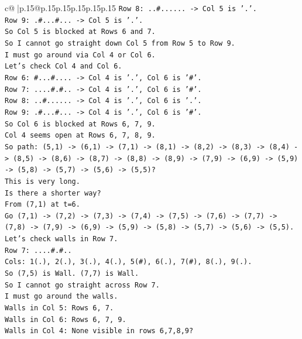 \documentclass{article}
\begin{document}
{\begin{supertabular}{c@{$\;$}|p{.15\linewidth}@{}p{.15\linewidth}p{.15\linewidth}p{.15\linewidth}p{.15\linewidth}p{.15\linewidth}}
{{{\texttt{Row 8: ..\#...... {-}> Col 5 is '.'.} \\
\texttt{Row 9: .\#...\#... {-}> Col 5 is '.'.} \\
\texttt{So Col 5 is blocked at Rows 6 and 7.} \\
\texttt{So I cannot go straight down Col 5 from Row 5 to Row 9.} \\
\texttt{I must go around via Col 4 or Col 6.} \\
\texttt{Let's check Col 4 and Col 6.} \\
\texttt{Row 6: \#...\#.... {-}> Col 4 is '.', Col 6 is '\#'.} \\
\texttt{Row 7: ....\#.\#.. {-}> Col 4 is '.', Col 6 is '\#'.} \\
\texttt{Row 8: ..\#...... {-}> Col 4 is '.', Col 6 is '.'.} \\
\texttt{Row 9: .\#...\#... {-}> Col 4 is '.', Col 6 is '\#'.} \\
\texttt{So Col 6 is blocked at Rows 6, 7, 9.} \\
\texttt{Col 4 seems open at Rows 6, 7, 8, 9.} \\
\texttt{So path: (5,1) {-}> (6,1) {-}> (7,1) {-}> (8,1) {-}> (8,2) {-}> (8,3) {-}> (8,4) {-}> (8,5) {-}> (8,6) {-}> (8,7) {-}> (8,8) {-}> (8,9) {-}> (7,9) {-}> (6,9) {-}> (5,9) {-}> (5,8) {-}> (5,7) {-}> (5,6) {-}> (5,5)?} \\
\texttt{This is very long.} \\
\texttt{Is there a shorter way?} \\
\texttt{From (7,1) at t=6.} \\
\texttt{Go (7,1) {-}> (7,2) {-}> (7,3) {-}> (7,4) {-}> (7,5) {-}> (7,6) {-}> (7,7) {-}> (7,8) {-}> (7,9) {-}> (6,9) {-}> (5,9) {-}> (5,8) {-}> (5,7) {-}> (5,6) {-}> (5,5).} \\
\texttt{Let's check walls in Row 7.} \\
\texttt{Row 7: ....\#.\#..} \\
\texttt{Cols: 1(.), 2(.), 3(.), 4(.), 5(\#), 6(.), 7(\#), 8(.), 9(.).} \\
\texttt{So (7,5) is Wall. (7,7) is Wall.} \\
\texttt{So I cannot go straight across Row 7.} \\
\texttt{I must go around the walls.} \\
\texttt{Walls in Col 5: Rows 6, 7.} \\
\texttt{Walls in Col 6: Rows 6, 7, 9.} \\
\texttt{Walls in Col 4: None visible in rows 6,7,8,9?} \\
}}}
\end{supertabular}}
\end{document}
